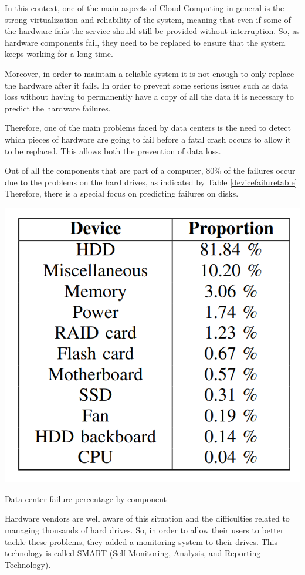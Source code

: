 In this context, one of the main aspects of Cloud Computing in general is the strong virtualization and reliability of the system\cite{Qian09}, meaning that even if some of the hardware fails the service should still be provided without interruption.
So, as hardware components fail, they need to be replaced to ensure that the system keeps working for a long time.

Moreover, in order to maintain a reliable system it is not enough to only replace the hardware after it fails.
In order to prevent some serious issues such as data loss without having to permanently have a copy of all the data it is necessary to predict the hardware failures.

Therefore, one of the main problems faced by data centers is the need to detect which pieces of hardware are going to fail before a fatal crash occurs to allow it to be replaced.
This allows both the prevention of data loss.

Out of all the components that are part of a computer, $80\%$ of the failures occur due to the problems on the hard drives, as indicated by Table \ref{devicefailuretable}
Therefore, there is a special focus on predicting failures on disks.

\begin{table}
    \begin{center}
      \includegraphics[width=.6\linewidth]{images/FailureProportions.png}
      \caption[Failure percentage by component]{Data center failure percentage by component - \cite{Wang17}}
      \label{devicefailuretable}
    \end{center}
  \end{table}

Hardware vendors are well aware of this situation and the difficulties related to managing thousands of hard drives.
So, in order to allow their users to better tackle these problems, they added a monitoring system to their drives.
This technology is called SMART (Self-Monitoring, Analysis, and Reporting Technology).

